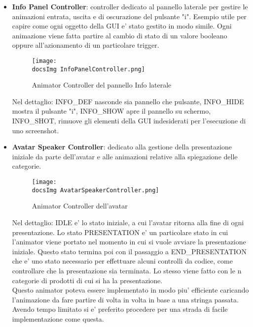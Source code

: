 \begin{itemize}
	\item \textbf{Info Panel Controller}: controller dedicato al pannello laterale per gestire le animazioni entrata, uscita e di oscurazione del pulsante "i". Esempio utile per capire come ogni oggetto della GUI e' stato gestito in modo simile. Ogni animazione viene fatta partire al cambio di stato di un valore booleano oppure all'azionamento di un particolare trigger.
	
	\begin{figure}[H]
		\centering
		\texttt{[image: \\docsImg InfoPanelController.png]}
		\caption{Animator Controller del pannello Info laterale}
		\label{fig:Animator Controller del pannello Info laterale}
	\end{figure}
	
	Nel dettaglio: INFO\_DEF nasconde sia pannello che pulsante, INFO\_HIDE mostra il pulsante "i", INFO\_SHOW apre il pannello su schermo, INFO\_SHOT, rimuove gli elementi della GUI indesiderati per l'esecuzione di uno screenshot.
	
	\item \textbf{Avatar Speaker Controller}: dedicato alla gestione della presentazione iniziale da parte dell'avatar e alle animazioni relative alla spiegazione delle categorie.
	
	\begin{figure}[H]
		\centering
		\texttt{[image: \\docsImg AvatarSpeakerController.png]}
		\caption{Animator Controller dell'avatar}
		\label{fig:Animator Controller dell'avatar}
	\end{figure}
	
	Nel dettaglio: IDLE e' lo stato iniziale, a cui l'avatar ritorna alla fine di ogni presentazione. Lo stato PRESENTATION e' un particolare stato in cui l'animator viene portato nel momento in cui si vuole avviare la presentazione iniziale. Questo stato termina poi con il passaggio a END\_PRESENTATION che e' uno stato necessario per effettuare alcuni controlli da codice, come controllare che la presentazione sia terminata. Lo stesso viene fatto con le n categorie di prodotti di cui si ha la presentazione.\\ Questo animator poteva essere implementato in modo piu' efficiente caricando l'animazione da fare partire di volta in volta in base a una stringa passata. Avendo tempo limitato si e' preferito procedere per una strada di facile implementazione come questa.
\end{itemize}







